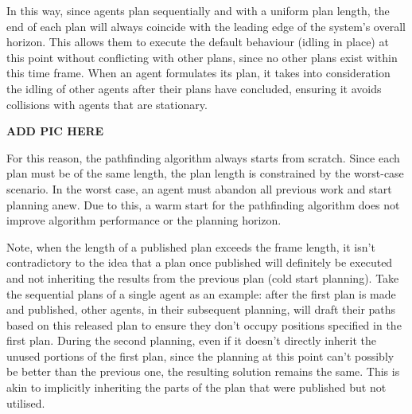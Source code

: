 In this way, since agents plan sequentially and with a uniform plan length, the end of each plan will always coincide with the leading edge of the system's overall horizon. This allows them to execute the default behaviour (idling in place) at this point without conflicting with other plans, since no other plans exist within this time frame. When an agent formulates its plan, it takes into consideration the idling of other agents after their plans have concluded, ensuring it avoids collisions with agents that are stationary.

\textbf{ADD PIC HERE} %

For this reason, the pathfinding algorithm always starts from scratch. Since each plan must be of the same length, the plan length is constrained by the worst-case scenario. In the worst case, an agent must abandon all previous work and start planning anew. Due to this, a warm start for the pathfinding algorithm does not improve algorithm performance or the planning horizon.

Note, when the length of a published plan exceeds the frame length, it isn't contradictory to the idea that a plan once published will definitely be executed and not inheriting the results from the previous plan (cold start planning). Take the sequential plans of a single agent as an example: after the first plan is made and published, other agents, in their subsequent planning, will draft their paths based on this released plan to ensure they don't occupy positions specified in the first plan. During the second planning, even if it doesn't directly inherit the unused portions of the first plan, since the planning at this point can't possibly be better than the previous one, the resulting solution remains the same. This is akin to implicitly inheriting the parts of the plan that were published but not utilised.

